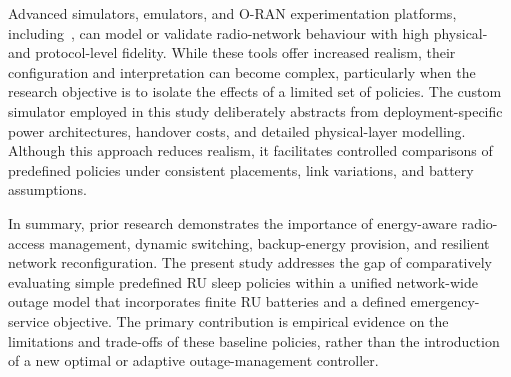 Advanced simulators, emulators, and O-RAN experimentation platforms, including~\cite{patriciello2019e2e,nardini2020simu5g,bonati2021colosseum,bonatiOpenRANGym}, can model or validate radio-network behaviour with high physical- and protocol-level fidelity. While these tools offer increased realism, their configuration and interpretation can become complex, particularly when the research objective is to isolate the effects of a limited set of policies. The custom simulator employed in this study deliberately abstracts from deployment-specific power architectures, handover costs, and detailed physical-layer modelling. Although this approach reduces realism, it facilitates controlled comparisons of predefined policies under consistent placements, link variations, and battery assumptions.

In summary, prior research demonstrates the importance of energy-aware radio-access management, dynamic switching, backup-energy provision, and resilient network reconfiguration. The present study addresses the gap of comparatively evaluating simple predefined RU sleep policies within a unified network-wide outage model that incorporates finite RU batteries and a defined emergency-service objective. The primary contribution is empirical evidence on the limitations and trade-offs of these baseline policies, rather than the introduction of a new optimal or adaptive outage-management controller.
